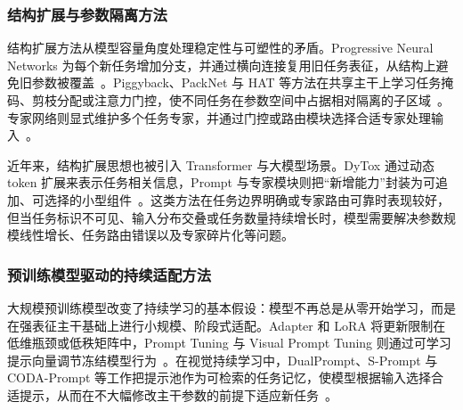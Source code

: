\subsubsection{结构扩展与参数隔离方法}

结构扩展方法从模型容量角度处理稳定性与可塑性的矛盾。Progressive Neural Networks 为每个新任务增加分支，并通过横向连接复用旧任务表征，从结构上避免旧参数被覆盖~\citep{rusu2016progressive}。Piggyback、PackNet 与 HAT 等方法在共享主干上学习任务掩码、剪枝分配或注意力门控，使不同任务在参数空间中占据相对隔离的子区域~\citep{mallya2018piggyback,Mallya_Lazebnik_2018,serra2018hat}。专家网络则显式维护多个任务专家，并通过门控或路由模块选择合适专家处理输入~\citep{aljundi2017expert}。

近年来，结构扩展思想也被引入 Transformer 与大模型场景。DyTox 通过动态 token 扩展来表示任务相关信息，Prompt 与专家模块则把“新增能力”封装为可追加、可选择的小型组件~\citep{Douillard_Rame_Couairon_Cord_2022,wang2022dualprompt,chen2024coin}。这类方法在任务边界明确或专家路由可靠时表现较好，但当任务标识不可见、输入分布交叠或任务数量持续增长时，模型需要解决参数规模线性增长、任务路由错误以及专家碎片化等问题。

\subsubsection{预训练模型驱动的持续适配方法}

大规模预训练模型改变了持续学习的基本假设：模型不再总是从零开始学习，而是在强表征主干基础上进行小规模、阶段式适配。Adapter 和 LoRA 将更新限制在低维瓶颈或低秩矩阵中，Prompt Tuning 与 Visual Prompt Tuning 则通过可学习提示向量调节冻结模型行为~\citep{houlsby2019parameter,hu2021lora,jia2022visual}。在视觉持续学习中，DualPrompt、S-Prompt 与 CODA-Prompt 等工作把提示池作为可检索的任务记忆，使模型根据输入选择合适提示，从而在不大幅修改主干参数的前提下适应新任务~\citep{wang2022dualprompt,wang2022s,smith2023coda}。

